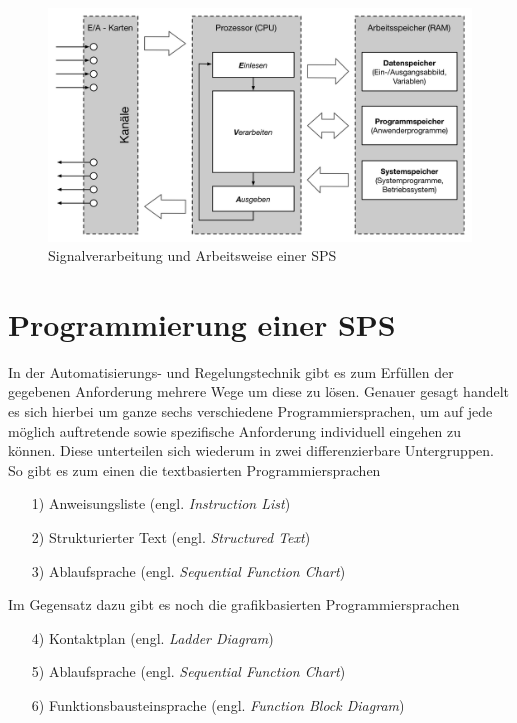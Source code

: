 	\begin{figure}[h!]
  		\centering
    	\includegraphics[width=1\textwidth]{graphics/stateoftheart/Signalverarbeitung_Selfmade.png}
  		\caption{Signalverarbeitung und Arbeitsweise einer \ac{SPS} \cite{mseitz_sps}}
  		\label{fig:eva}
	\end{figure}
		
	\section{Programmierung einer \ac{SPS}}

	In der Automatisierungs- und Regelungstechnik gibt es zum Erfüllen der gegebenen Anforderung mehrere Wege um diese zu lösen. Genauer gesagt handelt es sich hierbei um ganze sechs verschiedene Programmiersprachen, um auf jede möglich auftretende sowie spezifische Anforderung individuell eingehen zu können. Diese unterteilen sich wiederum in zwei differenzierbare Untergruppen. So gibt es zum einen die textbasierten Programmiersprachen
	
	\begin{itemize}
		\item[1)] Anweisungsliste (engl. \textit{Instruction List})
		\item[2)] Strukturierter Text (engl. \textit{Structured Text})
		\item[3)] Ablaufsprache (engl. \textit{Sequential Function Chart})
	\end{itemize}

	Im Gegensatz dazu gibt es noch die grafikbasierten Programmiersprachen
	
	\begin{itemize}
		\item[4)] Kontaktplan (engl. \textit{Ladder Diagram})
		\item[5)] Ablaufsprache (engl. \textit{Sequential Function Chart})
		\item[6)] Funktionsbausteinsprache (engl. \textit{Function Block Diagram})
	\end{itemize}
	
